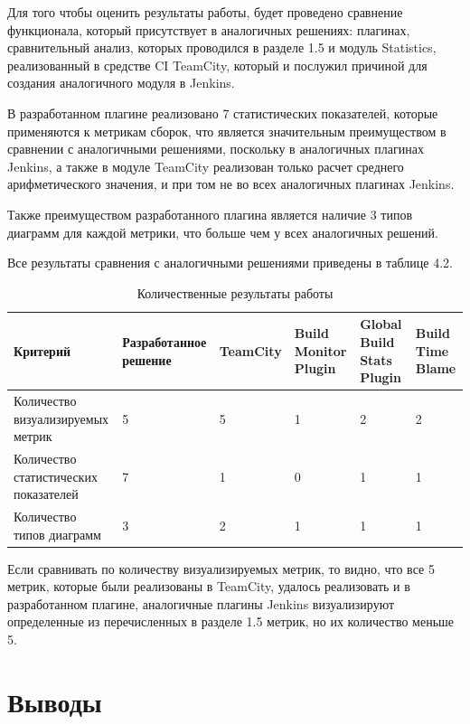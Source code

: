  Для того чтобы оценить результаты работы, будет проведено сравнение функционала, который присутствует в аналогичных решениях: плагинах, сравнительный анализ, которых проводился в разделе 1.5 и модуль Statistics, реализованный в средстве CI TeamCity, который и послужил причиной для создания аналогичного модуля в Jenkins.
 
 
 


В разработанном плагине реализовано 7 статистических показателей, которые применяются к метрикам сборок, что является значительным преимуществом в сравнении с аналогичными решениями, поскольку в аналогичных плагинах Jenkins, а также в модуле TeamCity реализован только расчет среднего арифметического значения, и при том не во всех аналогичных плагинах Jenkins.

Также преимуществом разработанного плагина является наличие 3 типов диаграмм для каждой метрики, что больше чем у всех аналогичных решений.

Все результаты сравнения с аналогичными решениями приведены в таблице 4.2.

 \begin{table}
    \centering
    \caption{Количественные результаты работы}
    \begin{tabular}{|p{3cm}|p{3cm}|p{2cm}|p{2cm}|p{2cm}|p{2cm}|}
    \hline
        Критерий & Разработанное решение & TeamCity & Build Monitor Plugin & Global Build Stats Plugin  & Build Time Blame \\ \hline
        Количество визуализируемых метрик & 5 & 5 & 1 & 2 &2 \\ \hline
        Количество статистических показателей & 7 & 1 & 0 & 1 &1\\ \hline
        Количество типов диаграмм & 3 & 2 & 1 & 1 &1\\ \hline


    \end{tabular}
\end{table}

Если сравнивать по количеству визуализируемых метрик, то видно, что все 5 метрик, которые были реализованы в TeamCity, удалось реализовать и в разработанном плагине, аналогичные плагины Jenkins визуализируют определенные из перечисленных в разделе 1.5 метрик, но их количество меньше 5.


 
 
\section{Выводы} \label{ch4:sec3}

